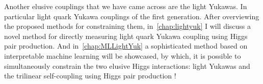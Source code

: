 \par Another elusive couplings that we have came across are the light Yukawas. In particular light quark Yukawa couplings of the first generation. After overviewing the proposed methods for constraining them, in~\autoref{chap:lightyuk} I will discuss a novel method for directly measuring light quark Yukawa coupling using Higgs pair production. And in~\autoref{chap:MLLightYuk} a sophisticated method based on interpretable machine learning will be showcased, by which, it is possible to simultaneously constrain the two elusive Higgs interactions: light Yukawas and the trilinear self-coupling using Higgs pair production !
